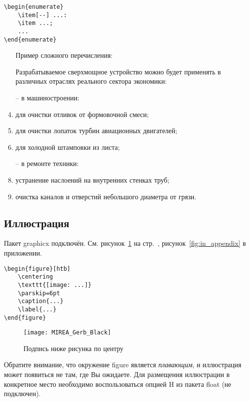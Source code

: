 \documentclass[14pt, a4paper, titlepage]{extarticle}
\begin{document}
\begin{verbatim}
\begin{enumerate}
    \item[--] ...:
    \item ...;
    ...
\end{enumerate} 
\end{verbatim}

\begin{enumerate}
    \item[] Пример сложного перечисления:
    \item[] Разрабатываемое сверхмощное устройство можно будет применять в различных отраслях реального сектора экономики:
    \item[--] в машиностроении:
    \item для очистки отливок от формовочной смеси;
    \item для очистки лопаток турбин авиационных двигателей;
    \item для холодной штамповки из листа;
    \item[--] в ремонте техники:
    \item устранение наслоений на внутренних стенках труб;
    \item очистка каналов и отверстий небольшого диаметра от грязи.
\end{enumerate}

\subsection{Иллюстрация}
 
Пакет graphicx подключён. См. рисунок~\ref{fig:test_label} на стр.~\pageref{fig:test_label}, рисунок~\ref{fig:in_appendix} в приложении.


\begin{verbatim}
\begin{figure}[htb]
    \centering
    \texttt{[image: ...]}
    \parskip=6pt
    \caption{...}
    \label{...}
\end{figure}
\end{verbatim}

\begin{figure}[htb]
    \centering
    \texttt{[image: MIREA\_Gerb\_Black]}
    \parskip=6pt
    \caption{Подпись ниже рисунка по центру}
    \label{fig:test_label}
\end{figure}

Обратите внимание, что окружение figure является \emph{плавающим}, и иллюстрация может появиться не там, где Вы ожидаете. Для размещения иллюстрации в конкретное место необходимо воспользоваться опцией H из пакета float (не подключен).
\end{document}

